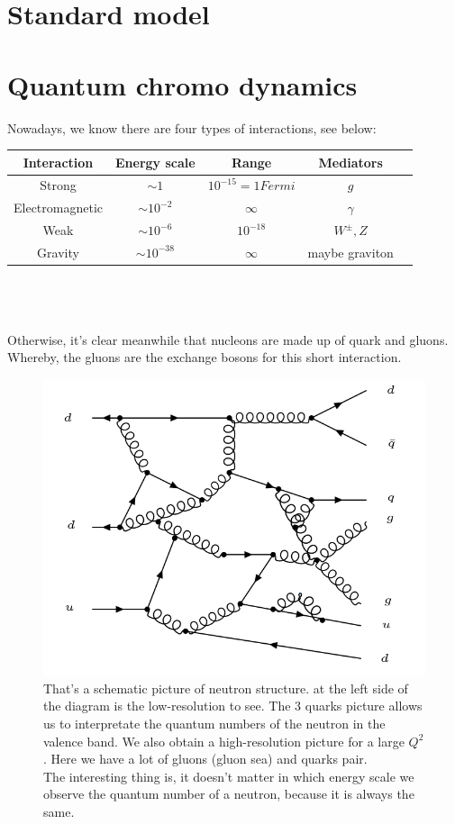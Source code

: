 \section{Standard model}

\section{Quantum chromo dynamics}

Nowadays, we know there are four types of interactions, see below:\\


\begin{tabular}{|c|c|c|c|c|}
\hline 
Interaction & Energy scale & Range & Mediators \\ 
\hline 
Strong & $ \sim 1 $  & $10^{-15}=1 Fermi$ & $g$ \\ 
\hline 
Electromagnetic & $ \sim 10^{-2} $ & $\infty$ & $\gamma $ \\ 
\hline  
Weak & $ \sim 10^{-6} $ & $10^{-18}$ & $W^{\pm}, Z$ \\ 
\hline
Gravity & $ \sim 10^{-38} $ & $\infty$ & maybe graviton \\ 
\hline 
\end{tabular}  
\\
\\
\\
Otherwise, it's clear meanwhile that nucleons are made up of quark and gluons.
Whereby, the gluons are the exchange bosons for this short interaction.
\begin{figure}[h!]
\centering
\includegraphics[scale=0.7]{images/Neutron.png}
\caption{That's a schematic picture of neutron structure. at the left side of the diagram is the low-resolution to see. The 3 quarks picture allows us to interpretate the quantum numbers of the neutron in the valence band.
We also obtain a high-resolution picture for a large $ Q^2 $. Here we have a lot of gluons (gluon sea) and quarks pair.\\ 
The interesting thing is, it doesn't matter in which energy scale we observe the quantum number of a neutron, because it is always the same.}
\end{figure}
